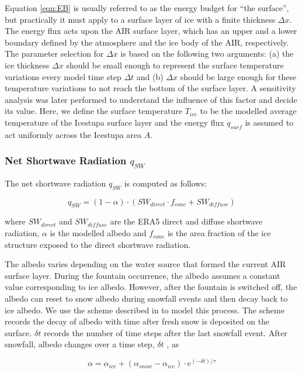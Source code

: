 \documentclass[utf8]{frontiersSCNS} %
\begin{document}
Equation \ref{eqn:EB} is usually referred to as the energy budget for “the surface”, but practically it must apply to a
surface layer of ice with a finite thickness $\Delta x$. The energy flux acts upon the AIR surface layer, which has an
upper and a lower boundary defined by the atmosphere and the ice body of the AIR, respectively. The parameter selection
for $\Delta x$ is based on the following two arguments: (a) the ice thickness $\Delta x$ should be small enough to
represent the surface temperature variations every model time step $\Delta t$ and (b) $\Delta x$ should be large enough
for these temperature variations to not reach the bottom of the surface layer. A sensitivity analysis was later
performed to understand the influence of this factor and decide its value. Here, we define the surface temperature
$T_{ice}$ to be the modelled average temperature of the Icestupa surface layer and the energy flux $q_{surf}$ is assumed
to act uniformly across the Icestupa area $A$.

\subsubsection{Net Shortwave Radiation \texorpdfstring{$q_{SW}$}{Lg}}

The net shortwave radiation $q_{SW}$ is computed as follows:

\begin{equation} q_{SW} = (1- \alpha)\cdot (SW_{direct} \cdot f_{cone} + SW_{diffuse}) \label{eqn:SW} \end{equation}

where $SW_{direct}$ and $SW_{diffuse}$ are the ERA5 direct and diffuse shortwave radiation, $\alpha$ is the modelled
albedo and $f_{cone}$ is the area fraction of the ice structure exposed to the direct shortwave radiation.

The albedo varies depending on the water source that formed the current AIR surface layer. During the fountain
occurrence, the albedo assumes a constant value corresponding to ice albedo. However, after the fountain is
switched off, the albedo can reset to snow albedo during snowfall events and then decay back to ice albedo. We use
the scheme described in \cite{OerlemansKnap_1998} to model this process. The scheme records the decay of albedo
with time after fresh snow is deposited on the surface. $\delta t$ records the number of time steps after the last
snowfall event. After snowfall, albedo changes over a time step, $\delta t$ , as

\begin{equation} \alpha=\alpha_{ice}+(\alpha_{snow}-\alpha_{ice}) \cdot e^{(-\delta t)/\tau} \label{eqn:a}
\end{equation}
\end{document}
